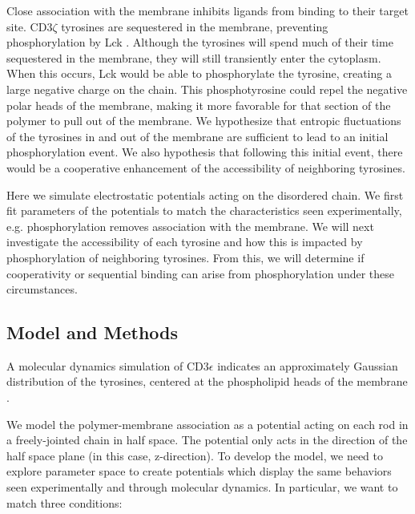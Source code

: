 \documentclass[../../AdvancementSummary.tex]{subfiles}
\begin{document}
Close association with the membrane inhibits ligands from binding to their target site. CD3$\zeta$ tyrosines are sequestered in the membrane, preventing phosphorylation by Lck \cite{Aivazian2000, Shi2013}. Although the tyrosines will spend much of their time sequestered in the membrane, they will still transiently enter the cytoplasm. When this occurs, Lck would be able to phosphorylate the tyrosine, creating a large negative charge on the chain. This phosphotyrosine could repel the negative polar heads of the membrane, making it more favorable for that section of the polymer to pull out of the membrane. We hypothesize that entropic fluctuations of the tyrosines in and out of the membrane are sufficient to lead to an initial phosphorylation event. We also hypothesis that following this initial event, there would be a cooperative enhancement of the accessibility of neighboring tyrosines.

Here we simulate electrostatic potentials acting on the disordered chain. We first fit parameters of the potentials to match the characteristics seen experimentally, e.g. phosphorylation removes association with the membrane. We will next investigate the accessibility of each tyrosine and how this is impacted by phosphorylation of neighboring tyrosines. From this, we will determine if cooperativity or sequential binding can arise from phosphorylation under these circumstances.


\subsection{Model and Methods}


A molecular dynamics simulation of CD3$\epsilon$ indicates an approximately Gaussian distribution of the tyrosines, centered at the phospholipid heads of the membrane \cite{Lopez2015}.

We model the polymer-membrane association as a potential acting on each rod in a freely-jointed chain in half space. The potential only acts in the direction of the half space plane (in this case, z-direction). To develop the model, we need to explore parameter space to create potentials which display the same behaviors seen experimentally and through molecular dynamics. In particular, we want to match three conditions:
\end{document}
